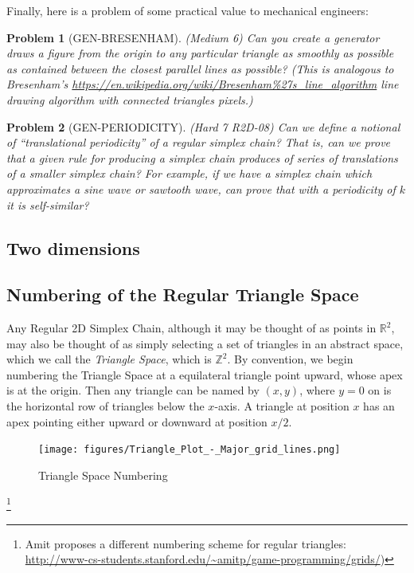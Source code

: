 \documentclass[11pt]{article}
\newtheorem{problem}{Problem}
\begin{document}
Finally, here is a problem of some practical value to mechanical engineers:
\begin{problem}[GEN-BRESENHAM]
  (Medium 6) Can you create a generator draws a figure from the origin to any particular triangle as smoothly as possible as contained
  between the closest parallel lines as possible? (This is analogous to Bresenham's \url{https://en.wikipedia.org/wiki/Bresenham%27s_line_algorithm}
    line drawing algorithm with connected triangles pixels.)
\end{problem}

\begin{problem}[GEN-PERIODICITY]
(Hard 7 R2D-08) Can we define a notional of ``translational periodicity'' of a regular simplex chain? That is, can we prove that
  a given rule for producing a simplex chain produces of series of translations of a smaller simplex chain? For example,
  if we have a simplex chain which approximates a sine wave or sawtooth wave, can prove that with a periodicity of $k$ it
  is self-similar?  
\end{problem}

\subsection{Two dimensions}

\subsection{Numbering of the Regular Triangle Space}

Any Regular 2D Simplex Chain, although it may be thought of as points in $\mathbb{R}^2$, may also be thought of as simply
selecting a set of triangles in an abstract space, which we call the {\em Triangle Space}, which is $\mathbb{Z}^2$. By convention,
we begin numbering the Triangle Space at a equilateral triangle point upward, whose apex is at the origin.  Then any triangle can be
named by $(x,y)$, where $y=0$ on is the horizontal row of triangles below the $x$-axis. A triangle at position $x$ has an apex
pointing either upward or downward at position $x/2$.

\begin{figure}
     \centering
     \texttt{[image: figures/Triangle\_Plot\_-\_Major\_grid\_lines.png]}
     \caption{Triangle Space Numbering}
  \label{fig:equitetrabeam}
\end{figure}

\footnote{ Amit proposes a different numbering scheme for regular triangles:
  \url{http://www-cs-students.stanford.edu/~amitp/game-programming/grids/})
}
\end{document}
